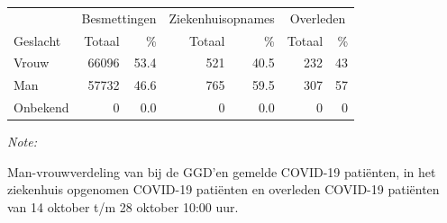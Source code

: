 \documentclass[
  english,
  man,floatsintext]{apa6}
\begin{document}
\begin{table}[H]
\centering\begingroup\fontsize{11}{13}\selectfont

\begin{threeparttable}
\begin{tabular}{lrrrrrr}
\toprule
\multicolumn{1}{c}{ } & \multicolumn{2}{c}{Besmettingen} & \multicolumn{2}{c}{Ziekenhuisopnames} & \multicolumn{2}{c}{Overleden} \\
\cmidrule(l{3pt}r{3pt}){2-3} \cmidrule(l{3pt}r{3pt}){4-5} \cmidrule(l{3pt}r{3pt}){6-7}
Geslacht & Totaal & \% & Totaal & \% & Totaal & \%\\
\midrule
Vrouw & 66096 & 53.4 & 521 & 40.5 & 232 & 43\\
Man & 57732 & 46.6 & 765 & 59.5 & 307 & 57\\
Onbekend & 0 & 0.0 & 0 & 0.0 & 0 & 0\\
\bottomrule
\end{tabular}
\begin{tablenotes}
\item \textit{Note: } 
\item Man-vrouwverdeling van bij de GGD’en gemelde COVID-19 patiënten, in het ziekenhuis opgenomen COVID-19 patiënten en overleden COVID-19 patiënten van 14 oktober t/m 28 oktober 10:00 uur.
\end{tablenotes}
\end{threeparttable}
\endgroup{}
\end{table}
\newpage
\end{document}
